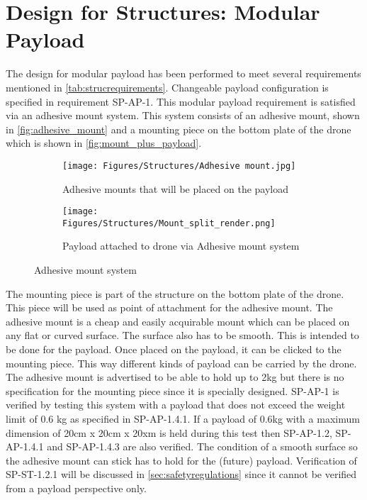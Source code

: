 \section{Design for Structures: Modular Payload} \label{sec:modpayload}

The design for modular payload has been performed to meet several requirements mentioned in \autoref{tab:strucrequirements}. Changeable payload configuration is specified in requirement SP-AP-1. This modular payload requirement is satisfied via an adhesive mount system. This system consists of an adhesive mount, shown in \autoref{fig:adhesive_mount} and a mounting piece on the bottom plate of the drone which is shown in \autoref{fig:mount_plus_payload}.


\begin{figure}[h]
     \centering
     \begin{subfigure}{0.5\textwidth}
         \centering
         \texttt{[image: Figures/Structures/Adhesive mount.jpg]}
         \caption{Adhesive mounts that will be placed on the payload}
         \label{fig:adhesive_mount}
     \end{subfigure}
     \hspace{4cm}
     \begin{subfigure}{0.5\textwidth}
         \centering
         \texttt{[image: Figures/Structures/Mount\_split\_render.png]}
         \caption{Payload attached to drone via Adhesive mount system}
         \label{fig:mount_plus_payload}
     \end{subfigure}
     \hfill
     \caption{Adhesive mount system}
     \label{fig:Adhesive mount system}
\end{figure}


 The  mounting piece is part of the structure on the bottom plate of the drone. This piece will be used as point of attachment for the adhesive mount. The adhesive mount is a cheap and easily acquirable mount which can be placed on any flat or curved surface. The surface also has to be smooth. This is intended to be done for the payload. Once placed on the payload, it can be clicked to the mounting piece. This way different kinds of payload can be carried by the drone. The adhesive mount is advertised to be able to hold up to 2kg but there is no specification for the mounting piece since it is specially designed. SP-AP-1\label{req:SP-AP-1} is verified by testing this system with a payload that does not exceed the weight limit of 0.6 kg as specified in SP-AP-1.4.1. If a payload of 0.6kg with a maximum dimension of 20cm x 20cm x 20xm is held during this test then SP-AP-1.2\label{req:SP-AP-1.2}, SP-AP-1.4.1\label{req:SP-AP-1.2} and SP-AP-1.4.3\label{req:SP-AP-1.4.3} are also verified. The condition of a smooth surface so the adhesive mount can stick has to hold for the (future) payload. Verification of SP-ST-1.2.1\label{req:SP-ST-1.2.1} will be discussed in \autoref{sec:safetyregulations} since it cannot be verified from a payload perspective only.
 
